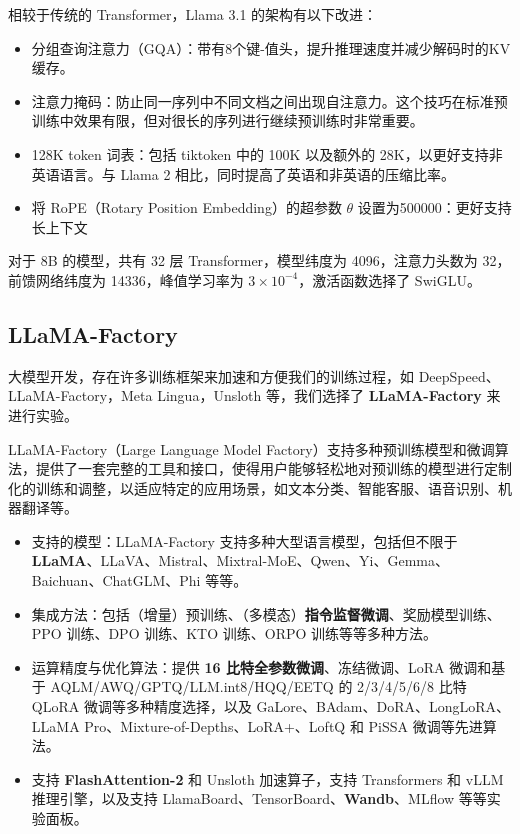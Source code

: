 相较于传统的 Transformer，Llama 3.1 的架构有以下改进：\begin{itemize}
    \item 分组查询注意力（GQA）：带有8个键-值头，提升推理速度并减少解码时的KV缓存。
    \item 注意力掩码：防止同一序列中不同文档之间出现自注意力。这个技巧在标准预训练中效果有限，但对很长的序列进行继续预训练时非常重要。
    \item 128K token 词表：包括 tiktoken 中的 100K 以及额外的 28K，以更好支持非英语语言。与 Llama 2 相比，同时提高了英语和非英语的压缩比率。
    \item 将 RoPE（Rotary Position Embedding）的超参数 $\theta$ 设置为500000：更好支持长上下文
\end{itemize}

对于 8B 的模型，共有 32 层 Transformer，模型纬度为 4096，注意力头数为 32，前馈网络纬度为 14336，峰值学习率为 $3\times10^{-4}$，激活函数选择了 SwiGLU。

\subsection{LLaMA-Factory}

大模型开发，存在许多训练框架来加速和方便我们的训练过程，如 DeepSpeed、LLaMA-Factory，Meta Lingua，Unsloth 等，我们选择了 \textbf{LLaMA-Factory} 来进行实验。\cite{zheng2024llamafactory}

LLaMA-Factory（Large Language Model Factory）支持多种预训练模型和微调算法，提供了一套完整的工具和接口，使得用户能够轻松地对预训练的模型进行定制化的训练和调整，以适应特定的应用场景，如文本分类、智能客服、语音识别、机器翻译等。\begin{itemize}
    \item 支持的模型：LLaMA-Factory 支持多种大型语言模型，包括但不限于 \textbf{LLaMA}、LLaVA、Mistral、Mixtral-MoE、Qwen、Yi、Gemma、Baichuan、ChatGLM、Phi 等等。
    \item 集成方法：包括（增量）预训练、（多模态）\textbf{指令监督微调}、奖励模型训练、PPO 训练、DPO 训练、KTO 训练、ORPO 训练等等多种方法。
    \item 运算精度与优化算法：提供 \textbf{16 比特全参数微调}、冻结微调、LoRA 微调和基于 AQLM/AWQ/GPTQ/LLM.int8/HQQ/EETQ 的 2/3/4/5/6/8 比特 QLoRA 微调等多种精度选择，以及 GaLore、BAdam、DoRA、LongLoRA、LLaMA Pro、Mixture-of-Depths、LoRA+、LoftQ 和 PiSSA 微调等先进算法。
    \item 支持 \textbf{FlashAttention-2} 和 Unsloth 加速算子，支持 Transformers 和 vLLM 推理引擎，以及支持 LlamaBoard、TensorBoard、\textbf{Wandb}、MLflow 等等实验面板。
\end{itemize}

